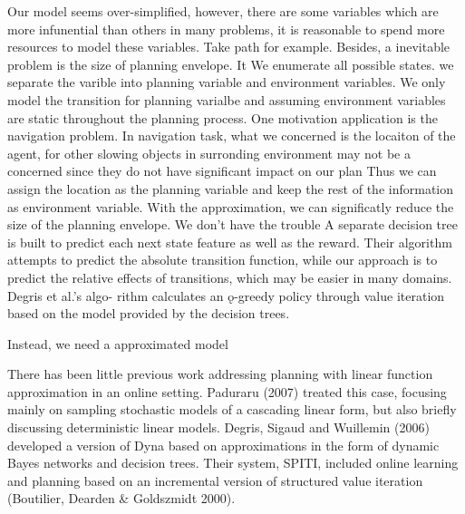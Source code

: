 Our model seems over-simplified, however, there are some variables which are more 
infunential than others in many problems, it is reasonable to spend more resources
to model these variables. Take path for example.
Besides, a inevitable problem is the size of planning envelope. It 
We enumerate all possible states.
we separate the varible into planning variable and environment variables.
We only model the transition for planning varialbe and assuming environment variables are
static throughout the planning process.
One motivation application is the navigation problem. In navigation task,
what we concerned is the locaiton of the agent, 
for other slowing objects in surronding environment may not be a concerned 
since they do not have significant impact on our plan
Thus we can assign the location
as the planning variable and keep the rest of the information as environment variable.
With the approximation, we can significatly reduce the size of the planning envelope.
We don't have the trouble 
A separate decision tree is built to predict each
next state feature as well as the reward. Their algorithm
attempts to predict the absolute transition function, while
our approach is to predict the relative effects of transitions,
which may be easier in many domains. Degris et al.’s algo-
rithm calculates an ǫ-greedy policy through value iteration
based on the model provided by the decision trees.




Instead, we need a approximated model

There has been little previous work addressing planning
with linear function approximation in an online setting.
Paduraru (2007) treated this case, focusing mainly on sampling
stochastic models of a cascading linear form, but
also briefly discussing deterministic linear models. Degris,
Sigaud and Wuillemin (2006) developed a version of Dyna
based on approximations in the form of dynamic Bayes networks
and decision trees. Their system, SPITI, included
online learning and planning based on an incremental version
of structured value iteration (Boutilier, Dearden &
Goldszmidt 2000).




